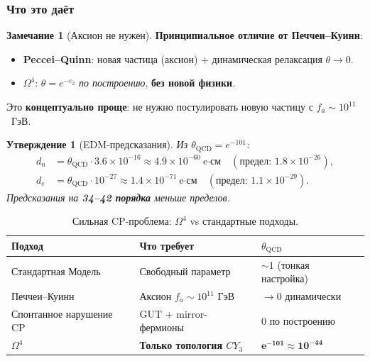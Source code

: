 \documentclass[11pt,a4paper]{article}
\newcommand{\CY}{CY_3}
\newcommand{\Om}{\Omega^4}
\newtheorem{proposition}[theorem]{Утверждение}
\theoremstyle{definition}
\newtheorem{remark}[theorem]{Замечание}
\begin{document}
\subsubsection{Что это даёт}

\begin{remark}[Аксион не нужен]
\label{rem:no-axion-review}
\textbf{Принципиальное отличие от Печчеи--Куинн}:
\begin{itemize}
    \item \textbf{Peccei--Quinn}: новая частица (аксион) +
          динамическая релаксация $\theta \to 0$.
    \item \textbf{$\Om$}: $\theta = e^{-c_2}$ \emph{по построению},
          \textbf{без новой физики}.
\end{itemize}
Это \textbf{концептуально проще}: не нужно постулировать новую
частицу с $f_a \sim 10^{11}$~ГэВ.
\end{remark}

\begin{proposition}[EDM-предсказания]
\label{prop:edm-review}
Из $\theta_{\text{QCD}} = e^{-101}$:
\begin{align}
    d_n &= \theta_{\text{QCD}} \cdot 3.6 \times 10^{-16}
        \approx 4.9 \times 10^{-60}~\text{e·см} \quad
        (\text{предел: } 1.8 \times 10^{-26}), \\
    d_e &= \theta_{\text{QCD}} \cdot 10^{-27}
        \approx 1.4 \times 10^{-71}~\text{e·см} \quad
        (\text{предел: } 1.1 \times 10^{-29}).
\end{align}
Предсказания на \textbf{34--42 порядка} меньше пределов.
\end{proposition}

\begin{table}[htbp]
\centering
\caption{Сильная CP-проблема: $\Om$ vs стандартные подходы.}
\label{tab:strong-cp-review}
\begin{tabular}{p{3cm}p{4.5cm}p{4.5cm}}
\toprule
Подход & Что требует & $\theta_{\text{QCD}}$ \\
\midrule
Стандартная Модель & Свободный параметр & $\sim 1$ (тонкая настройка) \\[0.3em]
Печчеи--Куинн & Аксион $f_a \sim 10^{11}$ ГэВ & $\to 0$ динамически \\[0.3em]
Спонтанное нарушение CP & GUT + mirror-фермионы & $0$ по построению \\[0.3em]
\textbf{$\Om$} & \textbf{Только топология $\CY$} &
    $\boldsymbol{e^{-101} \approx 10^{-44}}$ \\
\bottomrule
\end{tabular}
\end{table}
\end{document}

